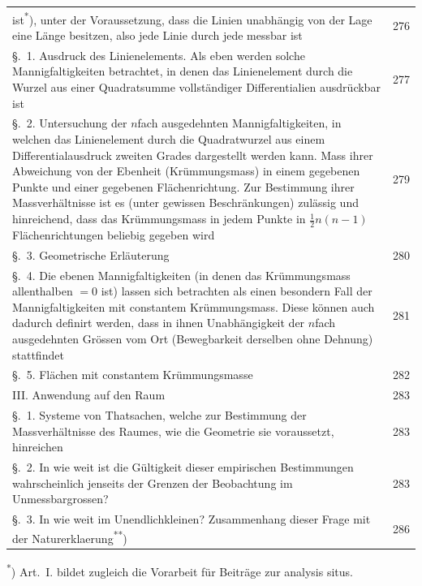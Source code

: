 \documentclass[12pt,a4paper]{article}
\begin{document}
\newpage
\begin{center}
\begin{tabular}{p{10cm}r}
\noindent ist\textsuperscript{*}), unter der Voraussetzung, dass die Linien unabh\"angig von der Lage eine L\"ange besitzen, also jede Linie durch jede messbar ist & 276 \\[2mm]
\quad \S.~1. Ausdruck des Linienelements. Als eben werden solche Mannigfaltigkeiten betrachtet, in denen das Linienelement durch die Wurzel aus einer Quadratsumme vollst\"andiger Differentialien ausdr\"uckbar ist & 277 \\[2mm]
\quad \S.~2. Untersuchung der $n$fach ausgedehnten Mannigfaltigkeiten, in welchen das Linienelement durch die Quadratwurzel aus einem Differentialausdruck zweiten Grades dargestellt werden kann. Mass ihrer Abweichung von der Ebenheit (Kr\"ummungsmass) in einem gegebenen Punkte und einer gegebenen Fl\"achenrichtung. Zur Bestimmung ihrer Massverh\"altnisse ist es (unter gewissen Beschr\"ankungen) zul\"assig und hinreichend, dass das Kr\"ummungsmass in jedem Punkte in $\frac{1}{2}n(n-1)$ Fl\"achenrichtungen beliebig gegeben wird & 279 \\[2mm]
\quad \S.~3. Geometrische Erl\"auterung & 280 \\[1mm]
\quad \S.~4. Die ebenen Mannigfaltigkeiten (in denen das Kr\"ummungsmass allenthalben $=0$ ist) lassen sich betrachten als einen besondern Fall der Mannigfaltigkeiten mit constantem Kr\"ummungsmass. Diese k\"onnen auch dadurch definirt werden, dass in ihnen Unabh\"angigkeit der $n$fach ausgedehnten Gr\"ossen vom Ort (Bewegbarkeit derselben ohne Dehnung) stattfindet & 281 \\[2mm]
\quad \S.~5. Fl\"achen mit constantem Kr\"ummungsmasse & 282 \\[2mm]
III. Anwendung auf den Raum & 283 \\[2mm]
\quad \S.~1. Systeme von Thatsachen, welche zur Bestimmung der Massverh\"altnisse des Raumes, wie die Geometrie sie voraussetzt, hinreichen & 283 \\[1mm]
\quad \S.~2. In wie weit ist die G\"ultigkeit dieser empirischen Bestimmungen wahrscheinlich jenseits der Grenzen der Beobachtung im Unmessbargrossen? & 283 \\[1mm]
\quad \S.~3. In wie weit im Unendlichkleinen? Zusammenhang dieser Frage mit der Naturerklaerung\textsuperscript{**}) & 286
\end{tabular}
\end{center}

\bigskip
\noindent\small\textsuperscript{*}) Art.~I. bildet zugleich die Vorarbeit f\"ur Beitr\"age zur analysis situs.
\end{document}
